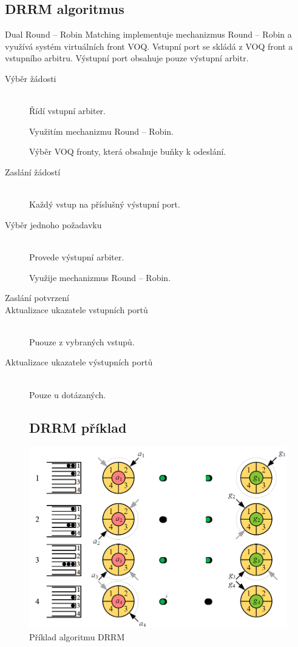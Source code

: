 \subsection{DRRM algoritmus}
Dual Round -- Robin Matching implementuje mechanizmus Round -- Robin a využívá systém virtuálních front VOQ. Vstupní port se skládá z VOQ front a vstupního arbitru. Výstupní port obsahuje pouze výstupní arbitr.
\begin{description}
  \item [Výběr žádosti] \hfill \\
  Řídí vstupní arbiter. \par
  Využitím mechanizmu Round -- Robin. \par
  Výběr VOQ fronty, která obsahuje buňky k odeslání. \par
  \item [Zaslání žádostí] \hfill \\
  Každý vstup na příslušný výstupní port. \par
  \item [Výběr jednoho požadavku] \hfill \\
  Provede výstupní arbiter. \par
  Využije mechanizmus Round -- Robin. \par
  \item[Zaslání potvrzení] \hfill
  \item [Aktualizace ukazatele vstupních portů] \hfill \\
  Puouze z vybraných vstupů. \par
  \item [Aktualizace ukazatele výstupních portů] \hfill \\
  Pouze u dotázaných. \par
  \subsection{DRRM příklad}
\end{description}
\begin{figure}[ht]
\centering
  \begin{center}
    \includegraphics[scale=0.5]{BPC-HWS/images/DRRM_priklad.png}
  \end{center}
  \caption[Příklad algoritmu DRRM]{Příklad algoritmu DRRM}
\end{figure}
